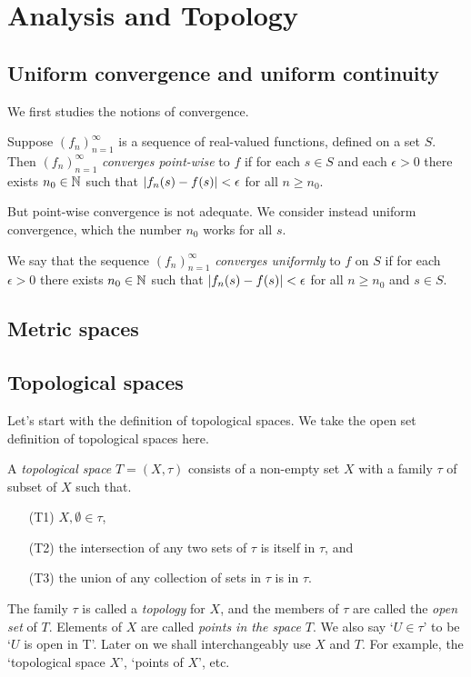 \documentclass[main.tex]{subfiles}
\begin{document}
	\chapter{Analysis and Topology}
	\section{Uniform convergence and uniform continuity}
		We first studies the notions of convergence.
		\begin{definition}
			Suppose $(f_n)_{n = 1}^\infty$ is a sequence of real-valued functions, defined on a set $S$. Then $(f_n)_{n = 1}^\infty$ \textit{converges point-wise} to $f$ if for each $s \in S$ and each $\epsilon > 0$ there exists $n_0 \in \mathbb N$ such that $\lvert f_n(s) - f(s)\rvert < \epsilon$ for all $n \geq n_0$.
		\end{definition}
		But point-wise convergence is not adequate. We consider instead uniform convergence, which the number $n_0$ works for all $s$.
		
		\begin{definition}
			We say that the sequence $(f_n)_{n = 1}^\infty$ \textit{converges uniformly} to $f$ on $S$ if for each $\epsilon > 0$ there exists $n_0 \in \mathbb N$ such that $\lvert f_n(s) - f(s)\rvert < \epsilon$ for all $n \geq n_0$ and $s \in S$.
		\end{definition}
		
		
	\section{Metric spaces}
	
	\section{Topological spaces}
		Let's start with the definition of topological spaces. We take the open set definition of topological spaces here.
		\begin{definition}
			A \textit{topological space} $T = (X, \tau)$ consists of a non-empty set $X$ with a family $\tau$ of subset of $X$ such that.
			\begin{itemize}
				\item [(T1)] $X, \emptyset \in \tau$,
				\item [(T2)] the intersection of any two sets of $\tau$ is itself in $\tau$, and
				\item [(T3)] the union of any collection of sets in $\tau$ is in $\tau$.
			\end{itemize}
		\end{definition}
		The family $\tau$ is called a \textit{topology} for $X$, and the members of $\tau$ are called the \textit{open set} of $T$. Elements of $X$ are called \textit{points in the space} $T$. We also say `$U \in \tau$' to be `$U$ is open in T'. Later on we shall interchangeably use $X$ and $T$. For example, the `topological space $X$', `points of $X$', etc.
		
\end{document}
